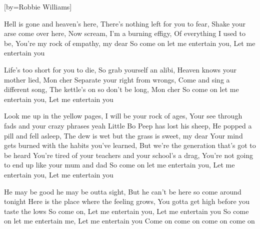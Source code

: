 

[by=Robbie Williams]


\beginverse
Hell is gone and heaven's here, There's nothing left for you to fear, Shake your arse come over here,
Now scream, I'm a burning effigy, Of everything I used to be, You're my rock of empathy, my dear
So come on let me entertain you, Let me entertain you
\endverse

\beginverse
Life's too short for you to die, So grab yourself an alibi, Heaven knows your mother lied, Mon cher
Separate your right from wrongs, Come and sing a different song, The kettle's on so don't be long, Mon cher
So come on let me entertain you, Let me entertain you
\endverse

\beginverse
Look me up in the yellow pages, I will be your rock of ages, Your see through fads and your crazy phrases yeah
Little Bo Peep has lost his sheep, He popped a pill and fell asleep, The dew is wet but the grass is sweet, my dear
Your mind gets burned with the habits you've learned, But we're the generation that's got to be heard
You're tired of your teachers and your school's a drag, You're not going to end up like your mum and dad
So come on let me entertain you, Let me entertain you, Let me entertain you
\endverse

\beginverse
He may be good he may be outta sight, But he can't be here so come around tonight
Here is the place where the feeling grows, You gotta get high before you taste the lows
So come on, Let me entertain you, Let me entertain you
So come on let me entertain me, Let me entertain you
Come on come on come on come on
\endverse



\chordson
\endsong
